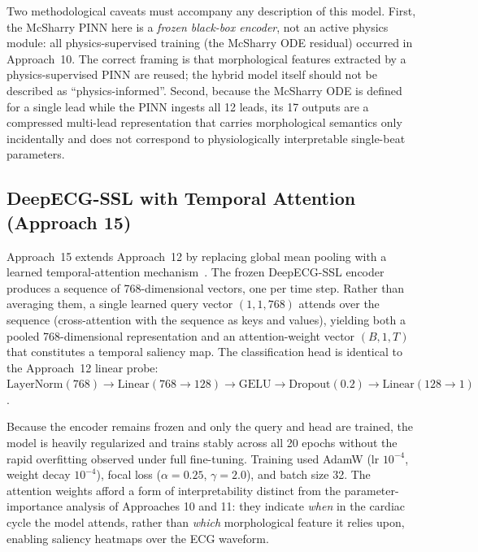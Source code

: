 Two methodological caveats must accompany any description of this model. First, the McSharry PINN here is a \emph{frozen black-box encoder}, not an active physics module: all physics-supervised training (the McSharry ODE residual) occurred in Approach~10. The correct framing is that morphological features extracted by a physics-supervised PINN are reused; the hybrid model itself should not be described as ``physics-informed''. Second, because the McSharry ODE is defined for a single lead while the PINN ingests all 12 leads, its 17 outputs are a compressed multi-lead representation that carries morphological semantics only incidentally and does not correspond to physiologically interpretable single-beat parameters.

\subsection{DeepECG-SSL with Temporal Attention (Approach 15)}
\label{sec:attention}

Approach~15 extends Approach~12 by replacing global mean pooling with a learned temporal-attention mechanism~\cite{vaswani2017attention}. The frozen DeepECG-SSL encoder produces a sequence of 768-dimensional vectors, one per time step. Rather than averaging them, a single learned query vector $(1, 1, 768)$ attends over the sequence (cross-attention with the sequence as keys and values), yielding both a pooled 768-dimensional representation and an attention-weight vector $(B, 1, T)$ that constitutes a temporal saliency map. The classification head is identical to the Approach~12 linear probe: $\text{LayerNorm}(768) \to \text{Linear}(768 \to 128) \to \text{GELU} \to \text{Dropout}(0.2) \to \text{Linear}(128 \to 1)$.

Because the encoder remains frozen and only the query and head are trained, the model is heavily regularized and trains stably across all 20 epochs without the rapid overfitting observed under full fine-tuning. Training used AdamW (lr $10^{-4}$, weight decay $10^{-4}$), focal loss ($\alpha = 0.25$, $\gamma = 2.0$), and batch size 32. The attention weights afford a form of interpretability distinct from the parameter-importance analysis of Approaches 10 and 11: they indicate \emph{when} in the cardiac cycle the model attends, rather than \emph{which} morphological feature it relies upon, enabling saliency heatmaps over the ECG waveform.



